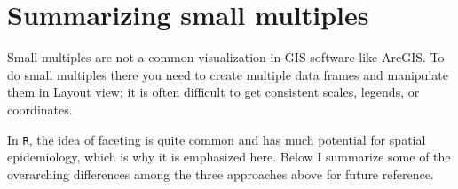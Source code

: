 \documentclass[
]{book}
\newcommand{\passthrough}[1]{#1}
\begin{document}
\hypertarget{summarizing-small-multiples}{%
\section{Summarizing small multiples}\label{summarizing-small-multiples}}

Small multiples are not a common visualization in GIS software like ArcGIS. To do small multiples there you need to create multiple data frames and manipulate them in Layout view; it is often difficult to get consistent scales, legends, or coordinates.

In \passthrough{\lstinline!R!}, the idea of faceting is quite common and has much potential for spatial epidemiology, which is why it is emphasized here. Below I summarize some of the overarching differences among the three approaches above for future reference.
\end{document}
